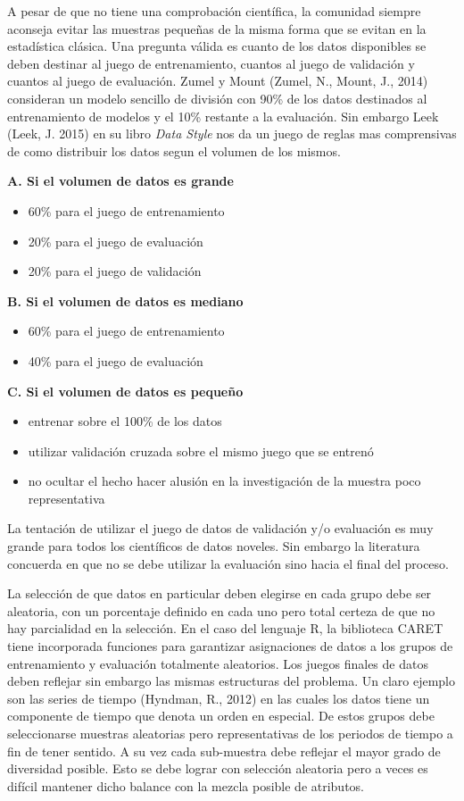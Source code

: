 \begin{spacing}{1.5}
A pesar de que no tiene una comprobación científica, la comunidad siempre aconseja evitar las muestras pequeñas de la misma forma que se evitan en la estadística clásica. Una pregunta válida es cuanto de los datos disponibles se deben destinar al juego de entrenamiento, cuantos al juego de validación y cuantos al juego de evaluación. Zumel y Mount (Zumel, N., Mount, J., 2014) consideran un modelo sencillo de división con 90\% de los datos destinados al entrenamiento de modelos y el 10\% restante a la evaluación. Sin embargo Leek (Leek, J. 2015) en su libro \emph{Data Style} nos da un juego de reglas mas comprensivas de como distribuir los datos segun el volumen de los mismos. 

\textbf{A. Si el volumen de datos es grande}
\begin{itemize}
	\item 60\% para el juego de entrenamiento
	\item 20\% para el juego de evaluación
	\item 20\% para el juego de validación 
\end{itemize}

\textbf{B. Si el volumen de datos es mediano}
\begin{itemize}
	\item 60\% para el juego de entrenamiento
	\item 40\% para el juego de evaluación
\end{itemize}

\textbf{C. Si el volumen de datos es pequeño}
\begin{itemize}
	\item entrenar sobre el 100\% de los datos
	\item utilizar validación cruzada sobre el mismo juego que se entrenó
	\item no ocultar el hecho hacer alusión en la investigación de la muestra poco representativa
\end{itemize}

La tentación de utilizar el juego de datos de validación y/o evaluación es muy grande para todos los científicos de datos noveles. Sin embargo la literatura concuerda en que no se debe utilizar la evaluación sino hacia el final del proceso. 

La selección de que datos en particular deben elegirse en cada grupo debe ser aleatoria, con un porcentaje definido en cada uno pero total certeza de que no hay parcialidad en la selección. En el caso del lenguaje R, la biblioteca CARET tiene incorporada funciones para garantizar asignaciones de datos a los grupos de entrenamiento y evaluación totalmente aleatorios. Los juegos finales de datos deben reflejar sin embargo las mismas estructuras del problema. Un claro ejemplo son las series de tiempo (Hyndman, R., 2012) en las cuales los datos tiene un componente de tiempo que denota un orden en especial. De estos grupos debe seleccionarse muestras aleatorias pero representativas de los periodos de tiempo a fin de tener sentido. A su vez cada sub-muestra debe reflejar el mayor grado de diversidad posible. Esto se debe lograr con selección aleatoria pero a veces es difícil mantener dicho balance con la mezcla posible de atributos.


\end{spacing}
